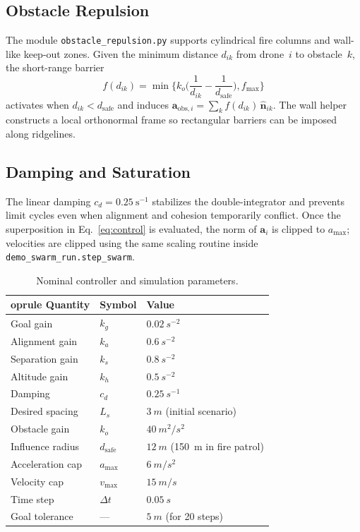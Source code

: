 \documentclass[conference]{AIAA}
\begin{document}
\subsection{Obstacle Repulsion}
The module \texttt{obstacle\_repulsion.py} supports cylindrical fire columns and wall-like keep-out zones.  Given the minimum distance \(d_{ik}\) from drone~$i$ to obstacle~$k$, the short-range barrier
\begin{equation}
	f(d_{ik}) = \min\bigg\{ k_o\Big(\frac{1}{d_{ik}} - \frac{1}{d_{\text{safe}}}\Big), f_{\max} \bigg\}
\end{equation}
activates when \(d_{ik} < d_{\text{safe}}\) and induces \(\mathbf{a}_{\text{obs},i} = \sum_k f(d_{ik})\,\hat{\mathbf{n}}_{ik}\).  The wall helper constructs a local orthonormal frame so rectangular barriers can be imposed along ridgelines.

\subsection{Damping and Saturation}
The linear damping $c_d=0.25~\text{s}^{-1}$ stabilizes the double-integrator and prevents limit cycles even when alignment and cohesion temporarily conflict.  Once the superposition in Eq.~\eqref{eq:control} is evaluated, the norm of \(\mathbf{a}_i\) is clipped to \(a_{\max}\); velocities are clipped using the same scaling routine inside \texttt{demo\_swarm\_run.step\_swarm}.

\begin{table}[t]
	\centering
	\caption{Nominal controller and simulation parameters.}
	\label{tab:param_summary}
	\begin{tabular}{@{}lll@{}}
			oprule
		Quantity & Symbol & Value \\
		\midrule
		Goal gain & $k_g$ & $\SI{0.02}{s^{-2}}$ \\
		Alignment gain & $k_a$ & $\SI{0.6}{s^{-2}}$ \\
		Separation gain & $k_s$ & $\SI{0.8}{s^{-2}}$ \\
		Altitude gain & $k_h$ & $\SI{0.5}{s^{-2}}$ \\
		Damping & $c_d$ & $\SI{0.25}{s^{-1}}$ \\
		Desired spacing & $L_s$ & $\SI{3}{m}$ (initial scenario) \\
		Obstacle gain & $k_o$ & $\SI{40}{m^2/s^2}$ \\
		Influence radius & $d_{\text{safe}}$ & $\SI{12}{m}$ (\SI{150}{m} in fire patrol) \\
		Acceleration cap & $a_{\max}$ & $\SI{6}{m/s^2}$ \\
		Velocity cap & $v_{\max}$ & $\SI{15}{m/s}$ \\
		Time step & $\Delta t$ & $\SI{0.05}{s}$ \\
		Goal tolerance & --- & $\SI{5}{m}$ (for 20 steps) \\
		\bottomrule
	\end{tabular}
\end{table}
\end{document}
